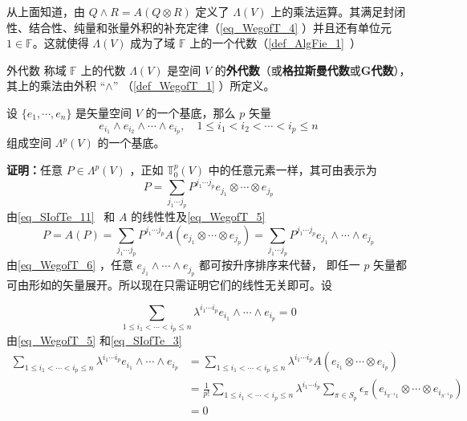 从上面知道，由 $Q \wedge R=A(Q\otimes R)$ 定义了 $\Lambda(V)$ 上的乘法运算。其满足封闭性、结合性、纯量和张量外积的补充定律（\autoref{eq_WegofT_4} ）并且还有单位元 $1\in\mathbb F$。这就使得 $\Lambda(V)$ 成为了域 $\mathbb F$ 上的一个代数（\autoref{def_AlgFie_1}~）
\begin{definition}{外代数}
称域 $\mathbb F$ 上的代数 $\Lambda(V)$ 是空间 $V$ 的\textbf{外代数}（或\textbf{格拉斯曼代数}或\textbf{G代数}），其上的乘法由外积 “$\wedge$” （\autoref{def_WegofT_1} ）所定义。
\end{definition}
\begin{theorem}{}\label{the_WegofT_1}
设 $\{e_1,\cdots,e_n\}$ 是矢量空间 $V$ 的一个基底，那么 $p$ 矢量
\begin{equation}\label{eq_WegofT_8}
e_{i_1}\wedge e_{i_2}\wedge\cdots\wedge e_{i_p},\quad 1\leq i_1<i_2<\cdots<i_p\leq n
\end{equation}
组成空间 $\Lambda^p(V)$ 的一个基底。
\end{theorem}
\textbf{证明：}任意 $P\in\Lambda^p(V)$ ，正如 $\mathbb T_0^p(V)$ 中的任意元素一样，其可由表示为
\begin{equation}
P=\sum_{j_1\cdots j_p}P^{j_1\cdots j_p}e_{j_1}\otimes\cdots\otimes e_{j_p}
\end{equation}
由\autoref{eq_SIofTe_11}~ 和 $A$ 的线性性及\autoref{eq_WegofT_5} 
\begin{equation}
P=A(P)=\sum_{j_1\cdots j_p}P^{j_1\cdots j_p}A(e_{j_1}\otimes\cdots\otimes e_{j_p})=\sum_{j_1\cdots j_p}P^{j_1\cdots j_p}e_{j_1}\wedge\cdots\wedge e_{j_p}
\end{equation}
由\autoref{eq_WegofT_6}  ，任意 $e_{j_1}\wedge\cdots\wedge e_{j_p}$ 都可按升序排序来代替， 即任一 $p$ 矢量都可由形如的矢量展开。所以现在只需证明它们的线性无关即可。设


\begin{equation}
\sum_{1\leq i_1<\cdots<i_p\leq n} \lambda^{i_1\cdots i_p} e_{i_1}\wedge\cdots\wedge e_{i_p}=0
\end{equation}
由\autoref{eq_WegofT_5}  和\autoref{eq_SIofTe_3}~
\begin{equation}\label{eq_WegofT_7}
\begin{aligned}
\sum_{1\leq i_1<\cdots<i_p\leq n} \lambda^{i_1\cdots i_p} e_{i_1}\wedge\cdots\wedge e_{i_p}&=\sum_{1\leq i_1<\cdots<i_p\leq n} \lambda^{i_1\cdots i_p} A(e_{i_1}\otimes\cdots\otimes e_{i_p})\\
&=\frac{1}{p!}\sum_{1\leq i_1<\cdots<i_p\leq n}\lambda^{i_1\cdots i_p}\sum_{\pi\in S_p}\epsilon_\pi(e_{i_{\pi^{-1} 1}}\otimes\cdots\otimes e_{i_{\pi^{-1} p}})\\
&=0
\end{aligned}
\end{equation}

